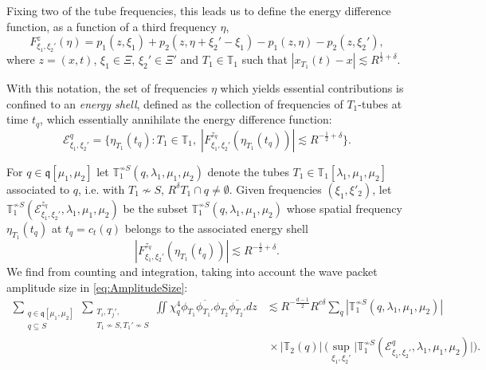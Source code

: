 \documentclass{amsart}
\theoremstyle{definition}
\newcommand{\T}{\mathbb{T}}
\begin{document}
\smallskip

Fixing two of the tube frequencies, this leads us to define the energy difference function, as a function of a third frequency $\eta$,
\begin{equation*}
F^z_{\xi_1,\xi_2'}(\eta) =p_1(z,\xi_1)+p_2(z,\eta+\xi_{2}'-\xi_{1})-p_1(z,\eta) - p_2(z,\xi_{2}'),
\end{equation*}
where $z=(x,t)$, $\xi_1 \in \Xi$, $\xi_2' \in \Xi'$ and $T_1 \in \T_1$ such that $|x_{T_1}(t) -x| \lesssim R^{\frac{1}{2}+\delta}$.

\smallskip

With this notation, the set of frequencies $\eta$ which yields essential contributions 
is confined to an \emph{energy shell}, defined as the collection of frequencies of $T_1$-tubes at time $t_q$, which essentially annihilate the energy difference function:
\begin{equation*}
\mathcal{E}^{q}_{\xi_1,\xi_2'} = \{ \eta_{T_1}(t_q) : T_1 \in \T_1, \; |F^{z_q}_{\xi_1,\xi_2'}(\eta_{T_1}(t_q))| \lesssim R^{-\frac{1}{2} +\delta } \}.
\end{equation*}

\smallskip
For $q \in \mathfrak{q}[\mu_1,\mu_2]$ let 
 $\T_1^{\not\sim S}(q,\lambda_1,\mu_1,\mu_2)$ denote the tubes $T_1 \in \T_1[\lambda_1,\mu_1,\mu_2]$ associated to $q$, i.e. with $T_1 \not\sim S$, $R^\delta T_1 \cap q \neq \emptyset$.
Given frequencies $(\xi_1,\xi'_2)$, let $\T_1^{\not\sim S}(\mathcal{E}^{z_q}_{\xi_1,\xi_2'},\lambda_1,\mu_1,\mu_2)$ be the subset $\T_1^{\not\sim S}(q,\lambda_1,\mu_1,\mu_2)$ 
whose spatial frequency $\eta_{T_1}(t_q)$ at $t_q=c_t(q)$ belongs to the associated energy shell
\begin{equation*}
|F^{z_q}_{\xi_1,\xi_2'}(\eta_{T_1}(t_q))| \lesssim R^{-\frac{1}{2}+\delta}.
\end{equation*}
We find from counting and integration, taking into account the wave packet amplitude size in \eqref{eq:AmplitudeSize}:
\begin{equation}
\label{eq:AuxEstimateEnergyI}
\begin{split}
\sum_{\substack{q \in \mathfrak{q}[\mu_1,\mu_2] \\  q \subseteq S}} \sum_{\substack{T_i,T_j',\\ T_1 \not\sim S, T_1' \not\sim S}} \iint \chi_q^4 \phi_{T_1} \overline{\phi_{T_1'}} \phi_{T_2} \overline{\phi_{T_2'}} dz &\lesssim R^{-\frac{d-1}{2}} R^{c \delta} \sum_q | \T_1^{\not\sim S}(q,\lambda_1,\mu_1,\mu_2)|   \\
&\, \times |\T_2(q)| \, \big( \sup_{\xi_1,\xi_2'} \big| \T_1^{\not\sim S}(\mathcal{E}^{q}_{\xi_1,\xi_2'},\lambda_1,\mu_1,\mu_2) \big| \big).
\end{split}
\end{equation}
\end{document}
